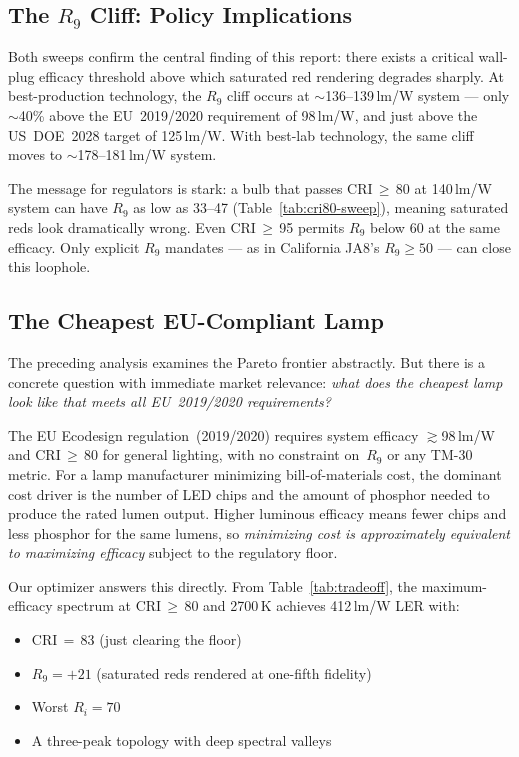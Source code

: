\documentclass[11pt]{article}
\begin{document}
\subsection{The $R_9$ Cliff: Policy Implications}

Both sweeps confirm the central finding of this report: there exists a
critical wall-plug efficacy threshold above which saturated red rendering
degrades sharply.  At best-production technology, the $R_9$ cliff occurs
at $\sim$136--139\,lm/W system --- only $\sim$40\% above the EU~2019/2020
requirement of 98\,lm/W, and just above the US~DOE~2028 target of
125\,lm/W.  With best-lab technology, the same cliff moves to
$\sim$178--181\,lm/W system.

The message for regulators is stark: a bulb that passes CRI\,$\geq$\,80
at 140\,lm/W system can have $R_9$ as low as 33--47
(Table~\ref{tab:cri80-sweep}), meaning saturated reds look dramatically
wrong.  Even CRI\,$\geq$\,95 permits $R_9$ below 60 at the same
efficacy.  Only explicit $R_9$ mandates --- as in California JA8's
$R_9 \geq 50$ --- can close this loophole.

\subsection{The Cheapest EU-Compliant Lamp}

The preceding analysis examines the Pareto frontier abstractly.  But there
is a concrete question with immediate market relevance: \emph{what does
the cheapest lamp look like that meets all EU~2019/2020 requirements?}

The EU Ecodesign regulation~(2019/2020) requires system efficacy
$\gtrsim$98\,lm/W and CRI\,$\geq$\,80 for general lighting, with no
constraint on~$R_9$ or any TM-30 metric.  For a lamp manufacturer
minimizing bill-of-materials cost, the dominant cost driver is the
number of LED chips and the amount of phosphor needed to produce the
rated lumen output.  Higher luminous efficacy means fewer chips and less
phosphor for the same lumens, so \emph{minimizing cost is approximately
equivalent to maximizing efficacy} subject to the regulatory floor.

Our optimizer answers this directly.  From Table~\ref{tab:tradeoff},
the maximum-efficacy spectrum at CRI\,$\geq$\,80 and 2700\,K achieves
412\,lm/W LER with:
\begin{itemize}
\item CRI\,$=$\,83 (just clearing the floor)
\item $R_9 = +21$ (saturated reds rendered at one-fifth fidelity)
\item Worst $R_i = 70$
\item A three-peak topology with deep spectral valleys
\end{itemize}
\end{document}
